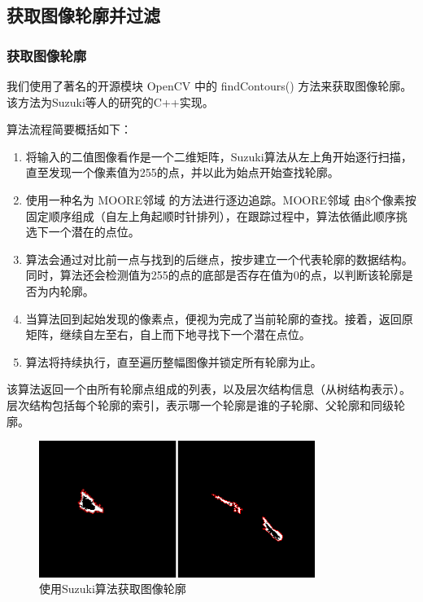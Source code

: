 \subsection{获取图像轮廓并过滤}\label{fig:3_4}

\subsubsection{获取图像轮廓}

我们使用了著名的开源模块 OpenCV 中的 findContours() 方法来获取图像轮廓。该方法为Suzuki等人\cite{suzuki1985topological}的研究的C++实现。

算法流程简要概括如下：

\begin{enumerate}
    \item 将输入的二值图像看作是一个二维矩阵，Suzuki算法从左上角开始逐行扫描，直至发现一个像素值为255的点，并以此为始点开始查找轮廓。
    \item 使用一种名为 MOORE邻域 的方法进行逐边追踪。MOORE邻域 由8个像素按固定顺序组成（自左上角起顺时针排列），在跟踪过程中，算法依循此顺序挑选下一个潜在的点位。
    \item 算法会通过对比前一点与找到的后继点，按步建立一个代表轮廓的数据结构。同时，算法还会检测值为255的点的底部是否存在值为0的点，以判断该轮廓是否为内轮廓。
    \item 当算法回到起始发现的像素点，便视为完成了当前轮廓的查找。接着，返回原矩阵，继续自左至右，自上而下地寻找下一个潜在点位。
    \item 算法将持续执行，直至遍历整幅图像并锁定所有轮廓为止。
\end{enumerate}

该算法返回一个由所有轮廓点组成的列表，以及层次结构信息（从树结构表示）。层次结构包括每个轮廓的索引，表示哪一个轮廓是谁的子轮廓、父轮廓和同级轮廓。

\begin{figure}[!htp]
    \centering
    \includegraphics[width=0.8\textwidth]{figures/3_4.png}
    \caption{使用Suzuki算法获取图像轮廓}
    \label{fig:3_4_获取轮廓}
\end{figure}

